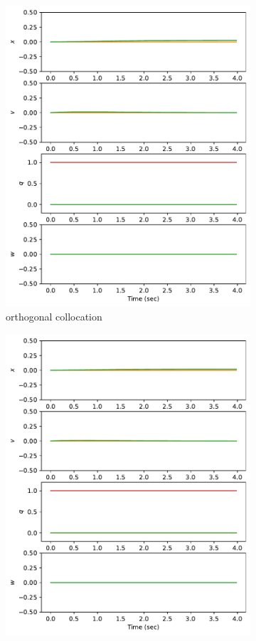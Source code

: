 \documentclass[]{article}
\begin{document}
\begin{figure}[H]
\begin{subfigure}[b]{0.3\textwidth}
		\includegraphics[width=\textwidth]{figures/statehover1.pdf}
		\caption{orthogonal collocation}
	\end{subfigure}%
	\begin{subfigure}[b]{0.3\textwidth}
		\centering
		\includegraphics[width=\textwidth]{figures/statehover2.pdf}

\end{subfigure}
\end{figure}
\end{document}

